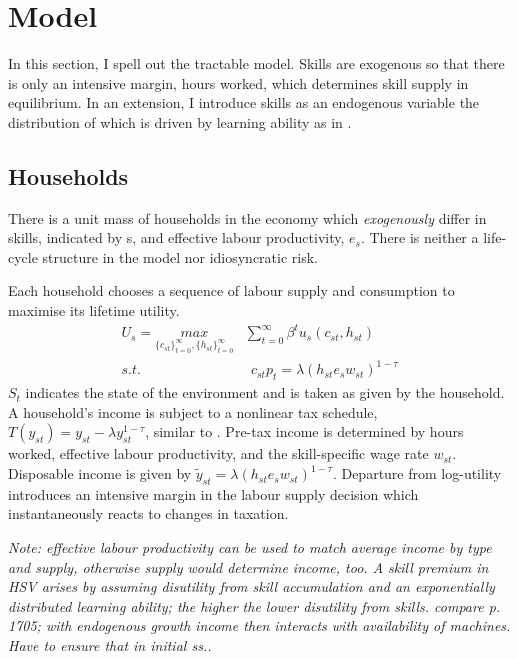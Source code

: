 \section{Model}

In this section, I spell out the tractable model. Skills are exogenous so that there is only an intensive margin, hours worked, which determines skill supply in equilibrium. In an extension, I introduce  skills as an endogenous variable the distribution of which is driven by learning ability as in \cite{Heathcote2017OptimalFramework}. 

\subsection{Households}
There is a unit mass of households in the economy which \textit{exogenously} differ in skills, indicated by s, and effective labour productivity, $e_{s}$. There is neither a life-cycle structure in the model nor idiosyncratic risk.

Each household chooses a sequence of labour supply and consumption to maximise its lifetime utility. 
\begin{align}
U_{s}=\underset{\{c_{st}\}_{t=0}^{\infty}, \{h_{st}\}_{t=0}^{\infty}}{max}&\sum_{t=0}^{\infty}\beta^t u_s(c_{st}, h_{st})\\
s.t.& \ \ c_{st}p_{t}=\lambda \left(h_{st}e_{s}w_{st}\right)^{1-\tau}
\end{align}
$S_t$ indicates the state of the environment and is taken as given by the household.
A household's income is subject to a nonlinear tax schedule, $T(y_{st})=y_{st}-\lambda y_{st}^{1-\tau}$, similar to \cite{Heathcote2017OptimalFramework}. Pre-tax income is determined by hours worked, effective labour productivity, and the skill-specific wage rate $w_{st}$. Disposable income is given by $\tilde{y}_{st}=\lambda \left(h_{st}e_{s}w_{st}\right)^{1-\tau}$.
Departure from log-utility introduces an intensive margin in the labour supply decision which instantaneously reacts to changes in taxation. 

\textit{Note: effective labour productivity can be used to match average income by type and supply, otherwise supply would determine income, too. A skill premium in HSV arises by assuming disutility from skill accumulation and an exponentially distributed learning ability; the higher the lower disutility from skills. compare p. 1705; with endogenous growth income then interacts with availability of machines. Have to ensure that in initial ss..}


